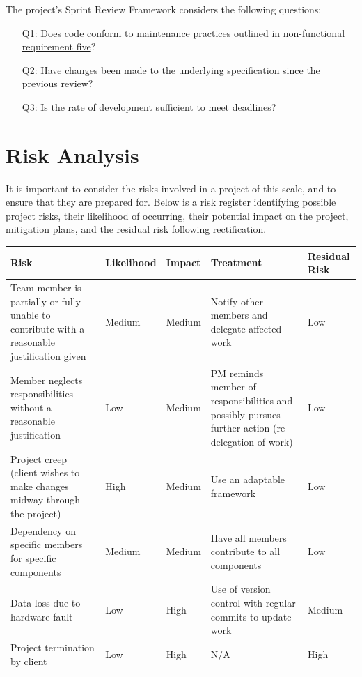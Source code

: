 \documentclass[9pt, titlepage]{extarticle}
\begin{document}
The project's Sprint Review Framework considers the following questions: 
\begin{itemize}[noitemsep, topsep=0pt, leftmargin=12mm]
 \item[Q1: ] Does code conform to maintenance practices outlined in \hyperref[sec:req:nf]{non-functional requirement five}? 
 \item[Q2: ] Have changes been made to the underlying specification since the previous review? 
 \item[Q3: ] Is the rate of development sufficient to meet deadlines? 
\end{itemize}

\section{Risk Analysis}
It is important to consider the risks involved in a project of this scale, and to ensure that they are prepared for. Below is a risk register identifying possible project risks, their likelihood of occurring, their potential impact on the project, mitigation plans, and the residual risk following rectification.

\begin{center}
    \begin{tabular}{|m{5cm}|m{1.8cm}|m{1.2cm}|m{4.5cm}|m{1.5cm}|}
    \hline
        \vspace{1mm}
        \textbf{Risk} & \textbf{Likelihood} & \textbf{Impact} & \textbf{Treatment} & \textbf{Residual Risk}  \\
        \hline
        Team member is partially or fully unable to contribute with a reasonable justification given &
        Medium &
        Medium &
        Notify other members and delegate affected work &
        Low \\
        \hline
        Member neglects responsibilities without a reasonable justification &
        Low &
        Medium &
        PM reminds member of responsibilities and possibly pursues further action (re-delegation of work) &
        Low \\
        \hline
        Project creep (client wishes to make changes midway through the project) &
        High &
        Medium &
        Use an adaptable framework &
        Low \\
        \hline
        Dependency on specific members for specific components &
        Medium &
        Medium &
        Have all members contribute to all components &
        Low \\
        \hline
        Data loss due to hardware fault &
        Low &
        High &
        Use of version control with regular commits to update work &
        Medium \\
        \hline
        Project termination by client &
        Low &
        High &
        N/A &
        High \\
         \hline
    \end{tabular}
\end{center}

\printbibliography[heading=bibintoc]
\end{document}
